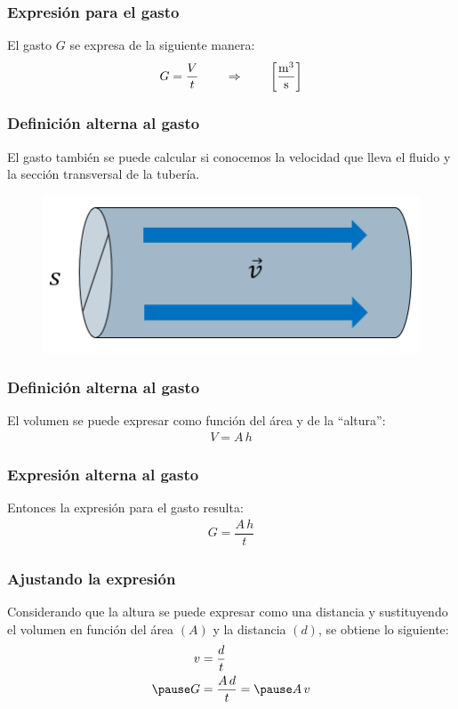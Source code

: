 \documentclass[14pt]{beamer}
\begin{document}
\begin{frame}
\frametitle{Expresión para el gasto}
El gasto $G$ se expresa de la siguiente manera:
\pause
\begin{align*}
G = \dfrac{V}{t} \hspace{0.75cm} \Rightarrow \hspace{0.75cm} \left[ \si[per-mode=fraction]{\cubic\meter\per\second} \right]
\end{align*}
\end{frame}
\begin{frame}
\frametitle{Definición alterna al gasto}
El gasto también se puede calcular si conocemos la velocidad que lleva el fluido y la sección transversal de la tubería.
\begin{figure}
    \centering
    \includegraphics[scale=0.65]{Imagenes/Gasto_02.png}
\end{figure}
\end{frame}
\begin{frame}
\frametitle{Definición alterna al gasto}
El volumen se puede expresar como función del área y de la \enquote{altura}:
\pause
\begin{align*}
V = A \, h
\end{align*}
\end{frame}
\begin{frame}
\frametitle{Expresión alterna al gasto}
Entonces la expresión para el gasto resulta:
\pause
\begin{align*}
G = \dfrac{A \, h}{t}
\end{align*}
\end{frame}
\begin{frame}
\frametitle{Ajustando la expresión}
Considerando que la altura se puede expresar como una distancia \pause y sustituyendo el volumen en función del área $(A)$ y la distancia $(d)$, se obtiene lo siguiente:
\begin{eqnarray*}
\begin{aligned}
v &= \dfrac{d}{t} \\ \pause 
G &= \dfrac{A \, d}{t} = \pause A \, v
\end{aligned}
\end{eqnarray*}
\end{frame}
\end{document}
